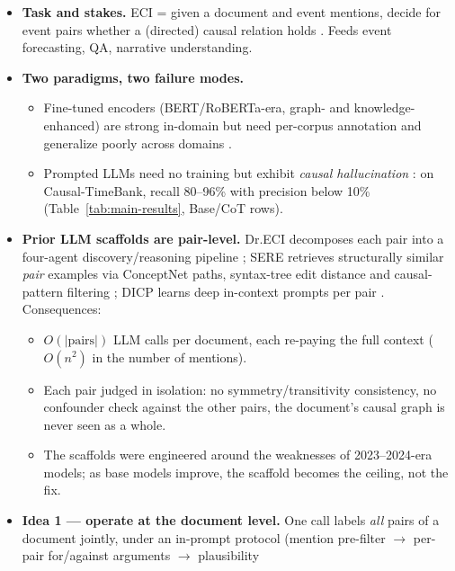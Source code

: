 \documentclass[11pt]{article}
\begin{document}
\begin{itemize}
  \item \textbf{Task and stakes.} ECI = given a document and event mentions, decide for
        event pairs whether a (directed) causal relation holds
        \citep{cheng2025survey}. Feeds event forecasting, QA, narrative understanding.
  \item \textbf{Two paradigms, two failure modes.}
        \begin{itemize}
          \item Fine-tuned encoders (BERT/RoBERTa-era, graph- and knowledge-enhanced)
                are strong in-domain but need per-corpus annotation and generalize
                poorly across domains \citep{cai2025dreci, hao2026sere}.
          \item Prompted LLMs need no training but exhibit \emph{causal
                hallucination} \citep{gao2023chatgpt}: on Causal-TimeBank,
                recall 80--96\% with precision below 10\% (Table~\ref{tab:main-results},
                Base/CoT rows).
        \end{itemize}
  \item \textbf{Prior LLM scaffolds are pair-level.} Dr.ECI decomposes each pair
        into a four-agent discovery/reasoning pipeline \citep{cai2025dreci}; SERE
        retrieves structurally similar \emph{pair} examples via ConceptNet paths,
        syntax-tree edit distance and causal-pattern filtering \citep{hao2026sere};
        DICP learns deep in-context prompts per pair \citep{mu2025dicp}. Consequences:
        \begin{itemize}
          \item $O(|\text{pairs}|)$ LLM calls per document, each re-paying the
                full context ($O(n^2)$ in the number of mentions).
          \item Each pair judged in isolation: no symmetry/transitivity
                consistency, no confounder check against the other pairs, the
                document's causal graph is never seen as a whole.
          \item The scaffolds were engineered around the weaknesses of
                2023--2024-era models; as base models improve, the scaffold
                becomes the ceiling, not the fix.
        \end{itemize}
  \item \textbf{Idea 1 --- operate at the document level.} One call labels
        \emph{all} pairs of a document jointly, under an in-prompt protocol
        (mention pre-filter $\to$ per-pair for/against arguments $\to$ plausibility

\end{itemize}
\end{document}
